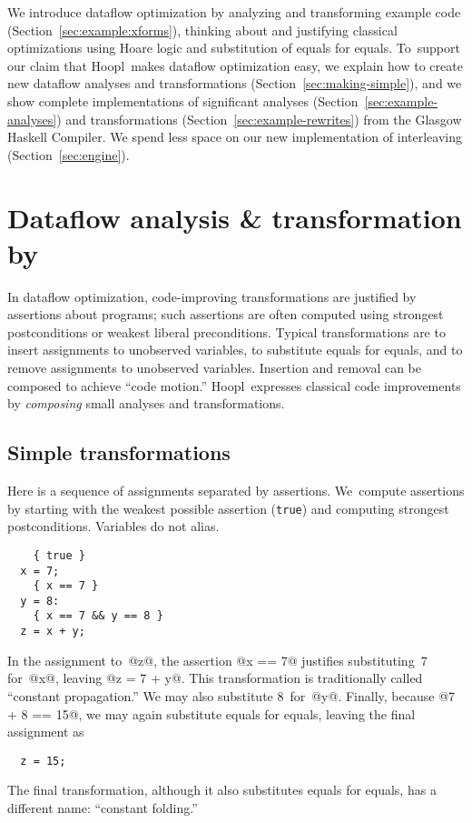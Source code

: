 \documentclass[blockstyle,preprint,natbib,nocopyrightspace]{sigplanconf}
\newcommand\ourlib{Hoopl}  %
\newcommand\naive{na\"\i ve}
\newcommand\delendum[1]{\relax\ifvmode\else\unskip\fi\relax}
\newcommand\secref[1]{Section~\ref{sec:#1}}
\newcommand\seclabel[1]{\label{sec:#1}}
\begin{document}
We introduce dataflow optimization by analyzing and transforming
example code (\secref{example:xforms}),
thinking about and justifying classical optimizations using
Hoare logic and substitution of equals for equals.
To~support our claim that \ourlib\ makes dataflow optimization easy, 
we explain how
to create new dataflow analyses and transformations
(\secref{making-simple}), and we show complete implementations of significant
analyses (\secref{example-analyses}) and transformations
(\secref{example-rewrites}) from the Glasgow Haskell Compiler.
We spend less space on our new implementation of interleaving (\secref{engine}).


\section{Dataflow analysis {\&} transformation by }

\seclabel{example:transforms}
\seclabel{example:xforms}

In dataflow optimization, code-improving transformations are justified
by assertions about programs;
such assertions are often computed using
strongest postconditions or weakest liberal preconditions.
Typical transformations are
to insert assignments to unobserved variables,
to substitute equals for equals, 
and
to remove assignments to unobserved variables.
Insertion and removal can be composed to achieve 
``code motion.''
\ourlib\  expresses classical code
improvements by \emph{composing} small \ifcutting\else analyses and \fi
transformations. 




\subsection{Simple transformations}

\seclabel{constant-propagation}

Here is a sequence of assignments separated by assertions.
We~compute assertions by starting with the weakest 
\ifcutting\else
possible
\fi
assertion (\texttt{true}) and computing strongest postconditions.
{Variables do not alias.}
\begin{verbatim}
    { true }
  x = 7;
    { x == 7 }
  y = 8: 
    { x == 7 && y == 8 }
  z = x + y;
\end{verbatim}
\delendum{SLPJ asks: Could we add $x=7,y=8,z=15$ as a final assertion?
We can but we should not, because a \naive\ sp function 
would produce the assertion $x=7\land y = 8
\land z = x+y$. To reach the point you desire, some sort of simplifier
would be required, and it is better to let the conclusion emerge
naturally as  the code is rewritten.}
In the assignment to~@z@, the assertion @x == 7@ justifies
substituting~7 for~@x@, leaving @z = 7 + y@.  
This transformation is traditionally called ``constant propagation.''
We may also substitute 8~for~@y@.
Finally, because @7 + 8 == 15@, we may again substitute equals for
equals, leaving the final assignment as
\begin{verbatim}
  z = 15;
\end{verbatim}
The final transformation, although it also substitutes equals
for equals, has a different name: ``constant folding.''
\end{document}
